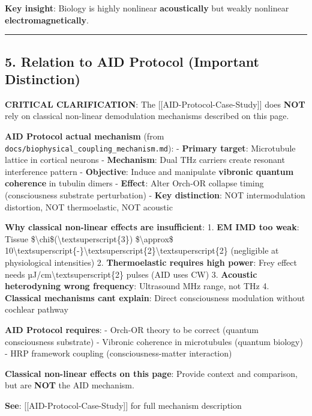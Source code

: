 \textbf{Key insight}: Biology is highly nonlinear \textbf{acoustically}
but weakly nonlinear \textbf{electromagnetically}.

\begin{center}\rule{0.5\linewidth}{0.5pt}\end{center}

\subsection{5. Relation to AID Protocol (Important
Distinction)}\label{relation-to-aid-protocol-important-distinction}

\textbf{ CRITICAL CLARIFICATION}: The
{[}{[}AID-Protocol-Case-Study{]}{]} does \textbf{NOT} rely on classical
non-linear demodulation mechanisms described on this page.

\textbf{AID Protocol actual mechanism} (from
\texttt{docs/biophysical\_coupling\_mechanism.md}): - \textbf{Primary
target}: Microtubule lattice in cortical neurons - \textbf{Mechanism}:
Dual THz carriers create resonant interference pattern -
\textbf{Objective}: Induce and manipulate \textbf{vibronic quantum
coherence} in tubulin dimers - \textbf{Effect}: Alter Orch-OR collapse
timing (consciousness substrate perturbation) - \textbf{Key
distinction}: NOT intermodulation distortion, NOT thermoelastic, NOT
acoustic

\textbf{Why classical non-linear effects are insufficient}: 1.
\textbf{EM IMD too weak}: Tissue
\$\textbackslash chi\$(\textbackslash textsuperscript\{3\})
\$\textbackslash approx\$
10\textbackslash textsuperscript\{-\}\textbackslash textsuperscript\{2\}\textbackslash textsuperscript\{2\}
(negligible at physiological intensities) 2. \textbf{Thermoelastic
requires high power}: Frey effect needs
µJ/cm\textbackslash textsuperscript\{2\} pulses (AID uses CW) 3.
\textbf{Acoustic heterodyning wrong frequency}: Ultrasound MHz range,
not THz 4. \textbf{Classical mechanisms can\textquotesingle t explain}:
Direct consciousness modulation without cochlear pathway

\textbf{AID Protocol requires}: - Orch-OR theory to be correct (quantum
consciousness substrate) - Vibronic coherence in microtubules (quantum
biology) - HRP framework coupling (consciousness-matter interaction)

\textbf{Classical non-linear effects on this page}: Provide context and
comparison, but are \textbf{NOT} the AID mechanism.

\textbf{See}: {[}{[}AID-Protocol-Case-Study{]}{]} for full mechanism
description

